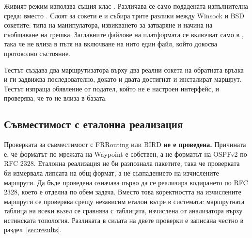 Живият режим използва същия клас . Различава се само подадената изпълнителна
среда:  вместо . Слоят за сокети е  и събира
трите разлики между Winsock и BSD сокетите: типа на манипулатора, извикването за затваряне
и начина на съобщаване на грешка. Заглавните файлове на платформата се включват само в
, така че  не влиза в пътя на включване на нито един
файл, който докосва протоколно състояние.

Тестът  създава два
маршрутизатора върху два реални сокета на обратната връзка и ги задвижва последователно,
докато и двата достигнат  и инсталират маршрут. Тестът
 изпраща обявление от подател, който
не е настроен интерфейс, и проверява, че то не влиза в базата.

\subsection{Съвместимост с еталонна реализация}

Проверката за съвместимост с FRRouting или BIRD \textbf{не е проведена.} Причината е, че
форматът по мрежата на Waypoint е собствен, а не форматът на OSPFv2 по RFC 2328. Еталонна
реализация не би разпознала пакетите, така че проверката би измервала липсата на общ
формат, а не съвпадението на изчислените маршрути. Да бъде проведена означава първо да се
реализира кодирането по RFC 2328, което е отделна по обем задача. Вместо това коректността
на изчислените маршрути се проверява срещу независим еталон вътре в системата: маршрутната
таблица на всеки възел се сравнява с таблицата, изчислена от анализатора върху истинската
топология. Разликата в силата на двете проверки е записана честно в
раздел~\ref{sec:results}.
